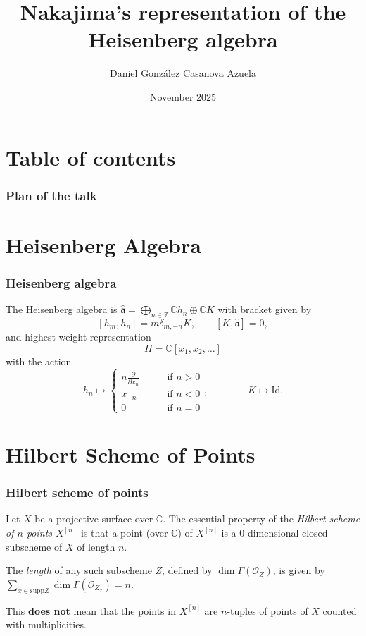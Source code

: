 \documentclass{beamer}
\title{Nakajima's representation of the Heisenberg algebra}
\author{Daniel González Casanova Azuela}
\institute{PUC-Rio}
\date{November 2025}
\begin{document}
\begin{frame}%
\titlepage
\end{frame}

\section*{Table of contents}
\label{section-toc}

\begin{frame}%
\frametitle{Plan of the talk}
\tableofcontents
\end{frame}

\section{Heisenberg Algebra}

\begin{frame}%
\frametitle{Heisenberg algebra}
The Heisenberg algebra is
$
\hat{\mathfrak{a}}=
\bigoplus_{n \in \mathbb{Z}} \mathbb{C}h_n \oplus\mathbb{C}K
$
with bracket given by 
$$
[h_m,h_n]=m\delta_{m,-n}K,\qquad 
[K,\hat{\mathfrak{a}}]=0,
$$
and highest weight representation 
$$
H=\mathbb{C}[x_1,x_2,\ldots]$$
with the action
$$
h_n\mapsto \begin{cases}
n \frac{\partial }{\partial x_n}\qquad &\text{if }n>0\\
x_{-n}\qquad &\text{if }n<0\\
0\qquad &\text{if }n=0
\end{cases},
\qquad \qquad  K\mapsto \text{Id}.
$$
\end{frame}

\section{Hilbert Scheme of Points}

\begin{frame}%
\frametitle{Hilbert scheme of points}
Let $X$ be a projective surface over $\mathbb{C}$.
The essential property of the 
{\it Hilbert scheme
of $n$ points $X^{[n]}$}
is that a point (over $\mathbb{C}$) of $X^{[n]}$
is a 0-dimensional closed subscheme of $X$
of length $n$.

\medskip\noindent
\pause
The {\it length} of any such subscheme $Z$, defined by
 $\dim\Gamma(\mathcal{O}_Z)$,
is given by
$\sum_{x \in \text{supp} Z}\dim\Gamma(\mathcal{O}_{Z_x})=n$.

\medskip\noindent
\pause
This {\bf does not} mean that the points in $X^{[n]}$ 
are $n$-tuples of points of $X$ counted with multiplicities.
\end{frame}
\end{document}
